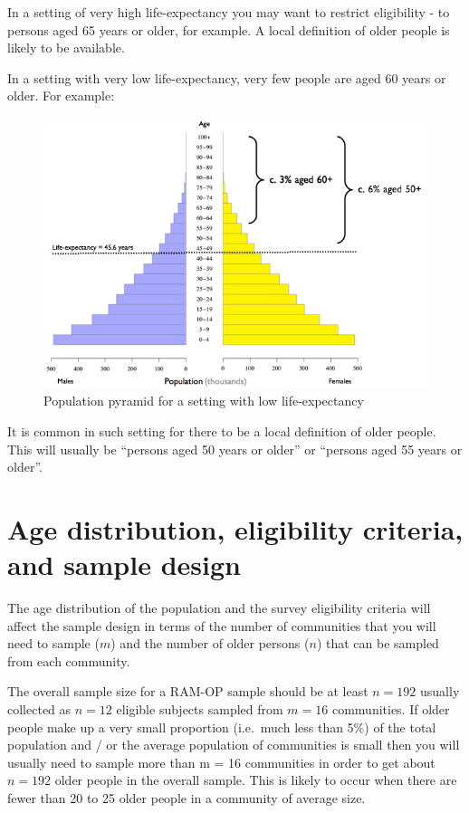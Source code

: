\documentclass[12pt,a4paper]{book}
\theoremstyle{definition}
\theoremstyle{definition}
\theoremstyle{definition}
\theoremstyle{remark}
\begin{document}
In a setting of very high life-expectancy you may want to restrict
eligibility - to persons aged 65 years or older, for example. A local
definition of older people is likely to be available.

In a setting with very low life-expectancy, very few people are aged 60
years or older. For example:

\begin{figure}[H]

{\centering \includegraphics{figures/popPyramid2} 

}

\caption{Population pyramid for a setting with low life-expectancy}\label{fig:sample3}
\end{figure}

It is common in such setting for there to be a local definition of older
people. This will usually be ``persons aged 50 years or older'' or
``persons aged 55 years or older''.

\hypertarget{age-distribution-eligibility-criteria-and-sample-design}{%
\section{Age distribution, eligibility criteria, and sample
design}\label{age-distribution-eligibility-criteria-and-sample-design}}

The age distribution of the population and the survey eligibility
criteria will affect the sample design in terms of the number of
communities that you will need to sample (\(m\)) and the number of older
persons (\(n\)) that can be sampled from each community.

The overall sample size for a RAM-OP sample should be at least
\(n = 192\) usually collected as \(n = 12\) eligible subjects sampled
from \(m = 16\) communities. If older people make up a very small
proportion (i.e.~much less than 5\%) of the total population and / or
the average population of communities is small then you will usually
need to sample more than m = 16 communities in order to get about
\(n = 192\) older people in the overall sample. This is likely to occur
when there are fewer than 20 to 25 older people in a community of
average size.
\end{document}
